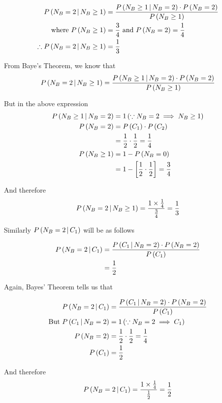 \documentclass[14pt,fleqn]{extarticle}
\begin{document}
\newcard 

\begin{align}
	P\left(N_B=2\,\vert\,N_B\geq 1\right) &= \frac{P\left(N_B\geq 1\,\vert\,N_B=2\right)\cdot P\left(N_B=2\right)}{P\left(N_B\geq 1\right)}\\
	\text{where } P \left(N_B\geq 1 \right) &= \frac{3}{4} \text{ and } P \left(N_B = 2 \right) = \frac{1}{4} \\
	\therefore P\left(N_B=2\,\vert\,N_B\geq 1\right) &= \frac{1}{3} 
\end{align}

\newcard 

From Baye's Theorem, we know that 
\small\[ P\left(N_B=2\,\vert\,N_B\geq 1\right) = \frac{P\left(N_B\geq 1\,\vert\,N_B=2\right)\cdot P\left(N_B=2\right)}{P\left(N_B\geq 1\right)}\]\normalsize 

But in the above expression 
\begin{align}
	P\left(N_B\geq 1\,\vert\,N_B = 2\right) &= 1 \left( \because N_B = 2\implies N_B \geq 1\right) \\
	P \left(N_B =2 \right) & = P \left(C_1 \right)\cdot P \left(C_2 \right) \\
	&= \frac{1}{2}\cdot\frac{1}{2} = \frac{1}{4} \\ 
	P \left(N_B\geq 1 \right) &= 1- P \left(N_B = 0 \right) \\
	&= 1- \left[\frac{1}{2}\cdot\frac{1}{2} \right] = \frac{3}{4} 
\end{align}

And therefore 
\[ P\left(N_B=2\,\vert\,N_B \geq 1 \right) = \frac{1\times\frac{1}{4}}{\frac{3}{4}} = \frac{1}{3} \] 

\newcard 

Similarly $P\left(N_B=2\,\vert\,C_1\right)$ will be as follows 

\begin{align}
P\left(N_B=2\,\vert\,C_1\right) &= \frac{P\left(C_1\,\vert\,N_B=2\right)\cdot P\left(N_B=2\right)}{P\left(C_1\right)}  \\ 
&= \frac{1}{2} 
\end{align}

\newcard 

Again, Bayes' Theorem tells us that 

\begin{align}
	P\left(N_B=2\,\vert\,C_1\right) &= \frac{P\left(C_1\,\vert\,N_B=2\right)\cdot P\left(N_B=2\right)}{P\left(C_1\right)}  \\
	\text{But } P\left(C_1\,\vert\,N_B=2\right) &= 1 \left(\because N_B=2 \implies C_1 \right) \\
	P \left(N_B=2 \right) &= \frac{1}{2}\cdot\frac{1}{2} = \frac{1}{4} \\
	P \left(C_1 \right) &= \frac{1}{2}
\end{align}

And therefore 
\[ P\left(N_B=2\,\vert\,C_1\right) = \dfrac{1\times\frac{1}{4}}{\frac{1}{2}} = \frac{1}{2} \]
\end{document}
